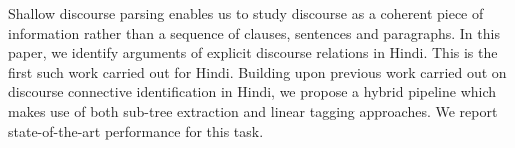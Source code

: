 Shallow discourse parsing enables us to study discourse as a coherent piece of information rather than a sequence of clauses, sentences and paragraphs. In this paper, we identify arguments of explicit discourse relations in Hindi. This is the first such work carried out for Hindi. Building upon previous work carried out on discourse connective identification in Hindi, we propose a hybrid pipeline which makes use of both sub-tree extraction and linear tagging approaches. We report state-of-the-art performance for this task.
